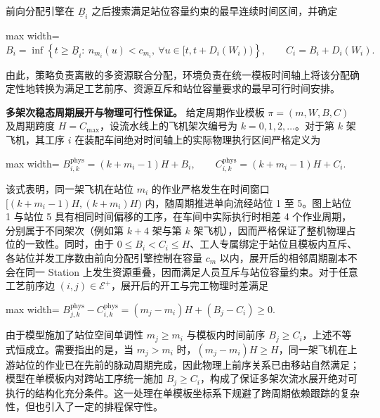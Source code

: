 \documentclass[journal,10pt]{IEEEtran}
\begin{document}
前向分配引擎在 \(\underline{B}_i\) 之后搜索满足站位容量约束的最早连续时间区间，并确定

\begin{center}
\begin{adjustbox}{max width=\columnwidth}
$\displaystyle
B_i=\inf\left\{
t\ge\underline{B}_i:\
n_{m_i}(u)<c_{m_i},\ \forall u\in[t,t+D_i(W_i))
\right\},
\qquad
C_i=B_i+D_i(W_i).
$
\end{adjustbox}
\end{center}

由此，策略负责离散的多资源联合分配，环境负责在统一模板时间轴上将该分配确定性地转换为满足工艺前序、资源互斥和站位容量要求的最早可行时间安排。

\textbf{多架次稳态周期展开与物理可行性保证。} 给定周期作业模板 \(\pi=(m,W,B,C)\) 及周期跨度 \(H=C_{\max}\)，设流水线上的飞机架次编号为 \(k=0,1,2,\ldots\)。对于第 \(k\) 架飞机，其工序 \(i\) 在装配车间绝对时间轴上的实际物理执行区间严格定义为

\begin{center}
\begin{adjustbox}{max width=\columnwidth}
$\displaystyle
B_{i,k}^{\mathrm{phys}}=(k+m_i-1)H+B_i,
\qquad
C_{i,k}^{\mathrm{phys}}=(k+m_i-1)H+C_i.
$
\end{adjustbox}
\end{center}

该式表明，同一架飞机在站位 \(m_i\) 的作业严格发生在时间窗口 \([(k+m_i-1)H,(k+m_i)H)\) 内，随周期推进单向流经站位 1 至 5。图上站位 1 与站位 5 具有相同时间偏移的工序，在车间中实际执行时相差 4 个作业周期，分别属于不同架次（例如第 \(k+4\) 架与第 \(k\) 架飞机），因而严格保证了整机物理占位的一致性。同时，由于 \(0\le B_i<C_i\le H\)、工人专属绑定于站位且模板内互斥、各站位并发工序数由前向分配引擎控制在容量 \(c_m\) 以内，展开后的相邻周期副本不会在同一 Station 上发生资源重叠，因而满足人员互斥与站位容量约束。对于任意工艺前序边 \((i,j)\in\mathcal E^+\)，展开后的开工与完工物理时差满足

\begin{center}
\begin{adjustbox}{max width=\columnwidth}
$\displaystyle
B_{j,k}^{\mathrm{phys}}-C_{i,k}^{\mathrm{phys}}
=(m_j-m_i)H+(B_j-C_i)\ge0.
$
\end{adjustbox}
\end{center}

由于模型施加了站位空间单调性 \(m_j\ge m_i\) 与模板内时间前序 \(B_j\ge C_i\)，上述不等式恒成立。需要指出的是，当 \(m_j > m_i\) 时，\((m_j - m_i)H \ge H\)，同一架飞机在上游站位的作业已在先前的脉动周期完成，因此物理上前序关系已由移站自然满足；模型在单模板内对跨站工序统一施加 \(B_j\ge C_i\)，构成了保证多架次流水展开绝对可执行的结构化充分条件。这一处理在单模板坐标系下规避了跨周期依赖跟踪的复杂性，但也引入了一定的排程保守性。
\end{document}
